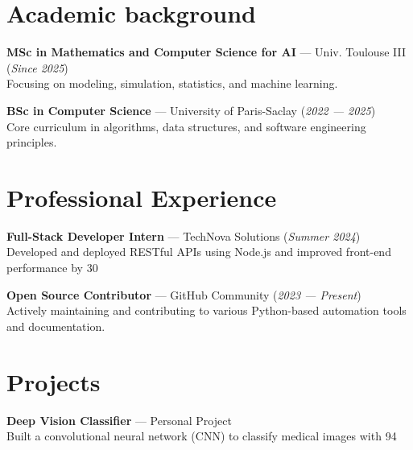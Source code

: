 \documentclass[a4paper,11pt]{article}
\begin{document}
\begin{minipage}[t]{0.63\textwidth}

\section*{Academic background}

\begin{tcolorbox}[cvbox]
\textbf{MSc in Mathematics and Computer Science for AI} — Univ. Toulouse III (\emph{Since 2025})\\
Focusing on modeling, simulation, statistics, and machine learning.
\end{tcolorbox}

\begin{tcolorbox}[cvbox]
\textbf{BSc in Computer Science} — University of Paris-Saclay (\emph{2022 — 2025})\\
Core curriculum in algorithms, data structures, and software engineering principles.
\end{tcolorbox}

\section*{Professional Experience}

\begin{tcolorbox}[cvbox]
\textbf{Full-Stack Developer Intern} — TechNova Solutions (\emph{Summer 2024})\\
Developed and deployed RESTful APIs using Node.js and improved front-end performance by 30%
\end{tcolorbox}

\begin{tcolorbox}[cvbox]
\textbf{Open Source Contributor} — GitHub Community (\emph{2023 — Present})\\
Actively maintaining and contributing to various Python-based automation tools and documentation.
\end{tcolorbox}

\section*{Projects}

\begin{tcolorbox}[cvbox]
\textbf{Deep Vision Classifier} — Personal Project \\ 
Built a convolutional neural network (CNN) to classify medical images with 94%
\end{tcolorbox}

\end{minipage}
\end{document}
